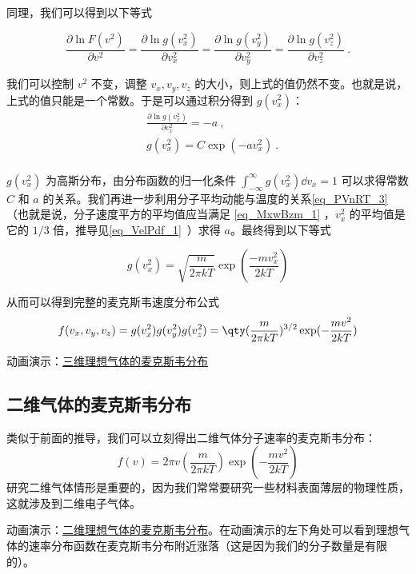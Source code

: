 同理，我们可以得到以下等式

\begin{equation}
\frac{\partial \ln F(v^2)}{\partial v^2}=\frac{\partial \ln g(v_x^2)}{\partial v_x^2}=\frac{\partial \ln g(v_y^2)}{\partial v_y^2}=\frac{\partial \ln g(v_z^2)}{\partial v_z^2}~.
\end{equation}

我们可以控制 $v^2$ 不变，调整 $v_x,v_y,v_z$ 的大小，则上式的值仍然不变。也就是说，上式的值只能是一个常数。于是可以通过积分得到 $g(v_x^2)$：
\begin{equation}
\begin{aligned}
&\frac{\partial \ln g(v_x^2)}{\partial v_x^2} = -a~,\\
&g(v_x^2)=C\exp(-av_x^2)~.\\
\end{aligned}
\end{equation}

$g(v_x^2)$ 为高斯分布，由分布函数的归一化条件 $\int_{-\infty}^\infty g(v_x^2)\dd v_x=1$ 可以求得常数 $C$ 和 $a$ 的关系。我们再进一步利用分子平均动能与温度的关系\autoref{eq_PVnRT_3}~ （也就是说，分子速度平方的平均值应当满足 \autoref{eq_MxwBzm_1} ，$v_x^2$ 的平均值是它的 $1/3$ 倍，推导见\autoref{eq_VelPdf_1}~）求得 $a$。最终得到以下等式

\begin{equation}
g(v_x^2)=\sqrt{\frac{m}{2\pi kT}}\exp(\frac{-mv_x^2}{2kT})
\end{equation}

从而可以得到完整的麦克斯韦速度分布公式
\begin{equation}
f(v_x,v_y,v_z)=g(v_x^2)g(v_y^2)g(v_z^2)=\qty(\frac{m}{2\pi k T})^{3/2}\exp(-\frac{mv^2}{2kT})
\end{equation}

动画演示：\href{https://wuli.wiki/apps/Maxwell3D/physics.html}{三维理想气体的麦克斯韦分布}

\subsection{二维气体的麦克斯韦分布}
类似于前面的推导，我们可以立刻得出二维气体分子速率的麦克斯韦分布：
\begin{equation}
f(v)=2\pi v\left(\frac{m}{2\pi kT}\right)\exp\left(-\frac{m v^2}{2kT}\right)
\end{equation}
研究二维气体情形是重要的，因为我们常常要研究一些材料表面薄层的物理性质，这就涉及到二维电子气体。

动画演示：\href{https://wuli.wiki/apps/Maxwell2D/physics.html}{二维理想气体的麦克斯韦分布}。在动画演示的左下角处可以看到理想气体的速率分布函数在麦克斯韦分布附近涨落（这是因为我们的分子数量是有限的）。